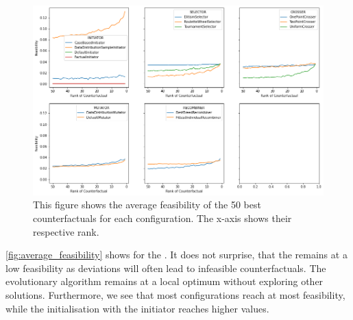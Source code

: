 \documentclass[./../../paper.tex]{subfiles}
\begin{document}
\begin{figure}
    \centering
    \includegraphics[width=\textwidth]{figures/results/result_configs_feasibility.png}
    \caption{This figure shows the average feasibility of the 50 best counterfactuals for each configuration. The x-axis shows their respective rank.}
    \label{fig:average_feasibility}
\end{figure}

\noindent \autoref{fig:average_feasibility} shows for the . It does not surprise, that the  remains at a low feasibility as deviations will often lead to infeasible counterfactuals. The evolutionary algorithm remains at a local optimum without exploring other solutions. Furthermore, we see that most configurations reach at most  feasibility, while the initialisation with the  initiator reaches higher values. 
\end{document}
